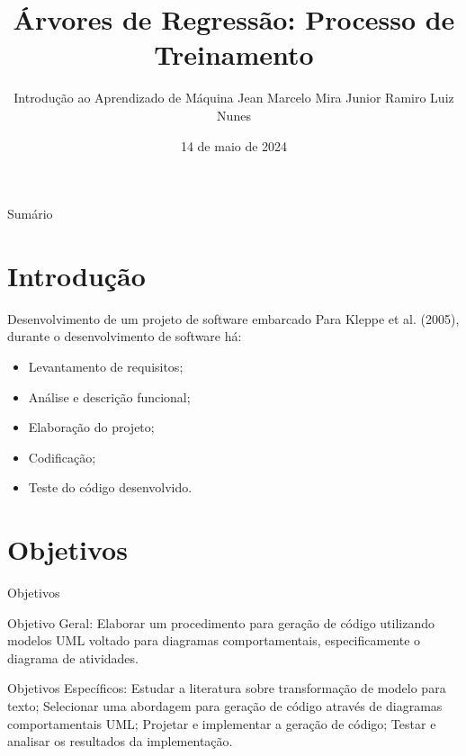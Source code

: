 \documentclass[handout,aspectratio = 169]{beamer}
\title{Árvores de Regressão: Processo de Treinamento}
\date{14 de maio de 2024}
\author[]{Introdução ao Aprendizado de Máquina \newline \newline Jean Marcelo Mira Junior \newline Ramiro Luiz Nunes}
\begin{document}

\frame{\titlepage}
\section[]{}
\begin{frame}{Sumário}
  \tableofcontents
\end{frame}


\section{Introdução}

\begin{frame}{Desenvolvimento de um projeto de software embarcado}
    Para Kleppe et al. (2005), durante o desenvolvimento de software há:
    \begin{itemize}
        \item Levantamento de requisitos;
        \item Análise e descrição funcional;
        \item Elaboração do projeto;
        \item Codificação;
        \item Teste do código desenvolvido.
    \end{itemize}
\end{frame}

\section{Objetivos}
\begin{frame}{Objetivos}
    \begin{outline}
        \1 Objetivo Geral:
        Elaborar um procedimento para geração de código utilizando modelos UML voltado para diagramas comportamentais, especificamente o diagrama de atividades.
    \end{outline}

    \begin{outline}
        \1 Objetivos Específicos:
        \2 Estudar a literatura sobre transformação de modelo para texto;
        \2 Selecionar uma abordagem para geração de código através de diagramas comportamentais UML;
        \2 Projetar e implementar a geração de código;
        \2 Testar e analisar os resultados da implementação.
    \end{outline}
\end{frame}
\end{document}

